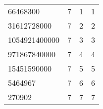 \begin{table}[H]
\begin{tabular}{llll}
66468300                                    & 7                                      & 1                                      & 1                                            \\
31612728000                                 & 7                                      & 2                                      & 2                                            \\
1054921400000                               & 7                                      & 3                                      & 3                                            \\
971867840000                                & 7                                      & 4                                      & 4                                            \\
15451590000                                 & 7                                      & 5                                      & 5                                            \\
5464967                                     & 7                                      & 6                                      & 6                                            \\
270902                                      & 7                                      & 7                                      & 7                                           
\end{tabular}
\end{table}
